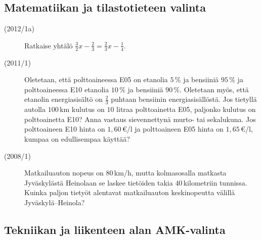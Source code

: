 \subsection*{Matematiikan ja tilastotieteen valinta}

\begin{description}
	\item[(2012/1a)] Ratkaise yhtälö $\frac{3}{2}x - \frac{2}{3} = \frac{2}{3}x - \frac{1}{4}$.
	\item[(2011/1)] Oletetaan, että polttoaineessa E05 on etanolia $5$\,\% ja bensiiniä $95$\,\% ja polttoaineessa E10 etanolia $10$\,\% ja bensiiniä $90$\,\%.
        Oletetaan myös, että etanolin energiasisältö on $\frac{2}{3}$ puhtaan bensiinin energiasisällöstä. Jos tietyllä autolla $100$\,km kulutus on $10$ litraa polttoainetta E05, paljonko kulutus on polttoainetta E10? Anna vastaus sievennettynä murto- tai sekalukuna. Jos polttoaineen E10 hinta on $1,60$\,€/l ja polttoaineen E05 hinta on $1,65$\,€/l, kumpaa on edullisempaa käyttää?
	\item[(2008/1)] Matkailuauton nopeus on $80$\,km/h, mutta kolmasosalla matkasta Jyväskylästä Heinolaan se laskee tietöiden takia $40$\,kilometriin tunnissa. Kuinka paljon tietyöt alentavat matkailuauton keskinopeutta välillä Jyväskylä--Heinola?
\end{description}

\subsection*{Tekniikan ja liikenteen alan AMK-valinta}


